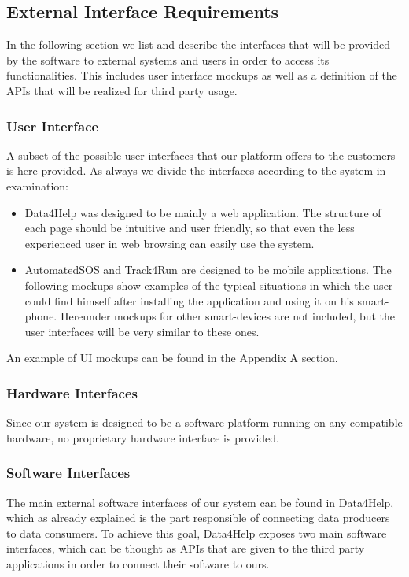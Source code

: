 \subsection{External Interface Requirements}
In the following section we list and describe the interfaces that will be provided by the software to external systems and users in order to access its functionalities. This includes user interface mockups as well as a definition of the APIs that will be realized for third party usage.

\subsubsection{User Interface}
A subset of the possible user interfaces that our platform offers to the customers is here provided. As always we divide the interfaces according to the system in examination:

\begin{itemize}
	\item Data4Help was designed to be mainly a web application. The structure of each page should be intuitive and user friendly, so that even the less experienced user in web browsing can easily use the system.
	\item AutomatedSOS and Track4Run are designed to be mobile applications. The following mockups show examples of the typical situations in which the user could find himself after installing the application and using it on his smart-phone. Hereunder mockups for other smart-devices are not included, but the user interfaces will be very similar to these ones. 
\end{itemize}

An example of UI mockups can be found in the Appendix A section.

\subsubsection{Hardware Interfaces}
Since our system is designed to be a software platform running on any compatible hardware, no proprietary hardware interface is provided.

\subsubsection{Software Interfaces}
The main external software interfaces of our system can be found in Data4Help, which as already explained is the part responsible of connecting data producers to data consumers.
To achieve this goal, Data4Help exposes two main software interfaces, which can be thought as APIs that are given to the third party applications in order to connect their software to ours.

